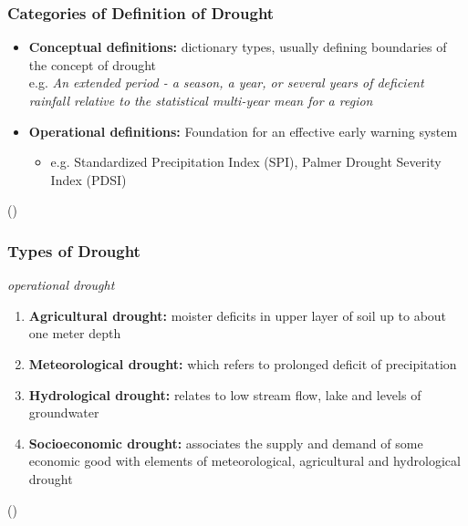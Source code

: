 \documentclass{beamer}              %
\begin{document}

\begin{frame}\label{Definition of Drought}
\frametitle{Categories of Definition of Drought} 
 \begin{itemize}


\item \textbf{Conceptual definitions:} dictionary types, usually defining boundaries of the concept of drought \\ 
e.g. \textit{An extended period - a season, a year, or several years of deficient rainfall relative to the statistical multi-year mean for a region \citep{schneider1996}}
\item \textbf{Operational definitions:} Foundation for an effective early warning system \begin{itemize}
\item e.g.  Standardized Precipitation Index (SPI), Palmer Drought Severity Index (PDSI)
\end{itemize} 
\end{itemize} 

(\citealp{wilhite1985,wilhite2000})
\end{frame}



\begin{frame}
\frametitle{Types of Drought}
\textit{operational drought} \\
  \begin{enumerate}
      \item \textbf{Agricultural drought:} moister deficits in upper layer of
soil up to about one meter depth
      \item \textbf{Meteorological drought:} which refers to prolonged
deficit of precipitation
      \item \textbf{Hydrological drought:} relates to low stream flow, lake and levels of groundwater
      \item \textbf{Socioeconomic drought:} associates the supply and demand of some economic good with elements of meteorological, agricultural and hydrological drought
  \end{enumerate}
  (\citealp{heim2002,IPCCtrenberth,AMS2013})
\end{frame}
\end{document}
